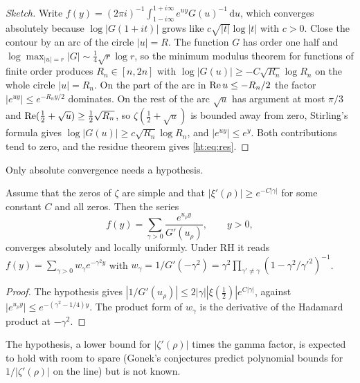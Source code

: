 \begin{proof}[Sketch]
Write $f(y)=(2\pi i)^{-1}\int_{1-i\infty}^{1+i\infty}e^{uy}G(u)^{-1}\,\mathrm{d}u$, which converges absolutely because $\log|G(1+it)|$ grows like $c\sqrt{|t|}\log|t|$ with $c>0$. Close the contour by an arc of the circle $|u|=R$. The function $G$ has order one half and $\log\max_{|u|=r}|G|\sim\frac14\sqrt r\log r$, so the minimum modulus theorem for functions of finite order \cite{Levin64} produces $R_n\in[n,2n]$ with $\log|G(u)|\ge-C\sqrt{R_n}\log R_n$ on the whole circle $|u|=R_n$. On the part of the arc in $\operatorname{Re} u\le-R_n/2$ the factor $|e^{uy}|\le e^{-R_ny/2}$ dominates. On the rest of the arc $\sqrt u$ has argument at most $\pi/3$ and $\operatorname{Re}(\frac12+\sqrt u)\ge\frac12\sqrt{R_n}$, so $\zeta(\tfrac12+\sqrt u)$ is bounded away from zero, Stirling's formula gives $\log|G(u)|\ge c\sqrt{R_n}\log R_n$, and $|e^{uy}|\le e^y$. Both contributions tend to zero, and the residue theorem gives \eqref{ht:eq:res}.
\end{proof}

Only absolute convergence needs a hypothesis.

\begin{theorem}\label{ht:thm:res}
Assume that the zeros of $\zeta$ are simple and that $|\xi'(\rho)|\ge e^{-C|\gamma|}$ for some constant $C$ and all zeros. Then the series
\begin{equation}\label{ht:eq:resRH}
f(y)=\sum_{\gamma>0}\frac{e^{u_\rho y}}{G'(u_\rho)},\qquad y>0,
\end{equation}
converges absolutely and locally uniformly. Under RH it reads $f(y)=\sum_{\gamma>0}w_\gamma e^{-\gamma^2y}$ with $w_\gamma=1/G'(-\gamma^2)=\gamma^2\prod_{\gamma'\ne\gamma}(1-\gamma^2/\gamma'^2)^{-1}$.
\end{theorem}

\begin{proof}
The hypothesis gives $|1/G'(u_\rho)|\le2|\gamma||\xi(\tfrac12)|e^{C|\gamma|}$, against $|e^{u_\rho y}|\le e^{-(\gamma^2-1/4)y}$. The product form of $w_\gamma$ is the derivative of the Hadamard product at $-\gamma^2$.
\end{proof}

The hypothesis, a lower bound for $|\zeta'(\rho)|$ times the gamma factor, is expected to hold with room to spare (Gonek's conjectures predict polynomial bounds for $1/|\zeta'(\rho)|$ on the line) but is not known. %

